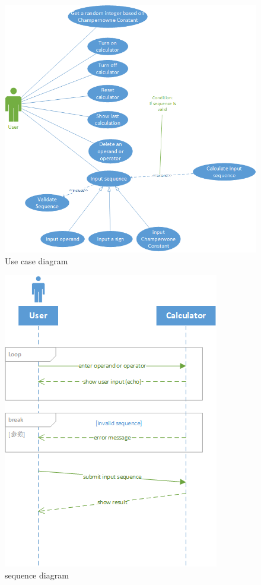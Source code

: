 \documentclass[10pt]{article}
\begin{document}
\begin{center}
  \begin{figure}[h!]
      \centering
      \includegraphics[width=0.9\linewidth]{image/useCaseDiagram.png}
      \caption{Use case diagram}
      \label{fig:my_label}
  \end{figure}
\end{center}

\begin{center}
  \begin{figure}[h!]
      \centering
      \includegraphics[width=0.7\linewidth]{image/sequenceDiagram.png}
      \caption{sequence diagram}
      \label{fig:my_label}
  \end{figure}
\end{center}
\end{document}
